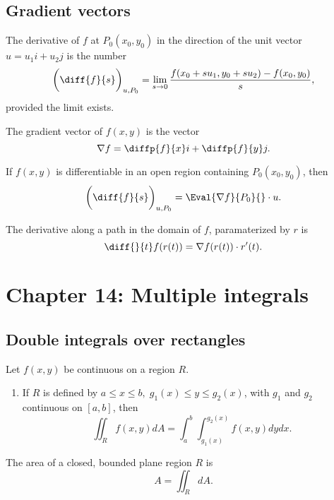 \documentclass{article}
\begin{document}
\subsection{Gradient vectors}
\begin{definition}
	The derivative of \(f\) at \(P_0(x_0,y_0)\) in the direction of the unit vector \(u=u_1i+u_2j\) is the number
	\begin{equation*}
		\bigg(\diff{f}{s}\bigg)_{u,P_0}=\lim_{s\rightarrow 0}\frac{f(x_0+su_1,y_0+su_2)-f(x_0,y_0)}{s},
	\end{equation*}
	provided the limit exists.
\end{definition}
\begin{definition}
	The gradient vector of \(f(x,y)\) is the vector
	\begin{equation*}
		\nabla f=\diffp{f}{x}i+\diffp{f}{y}j.
	\end{equation*}
\end{definition}
\begin{theorem}
	If \(f(x,y)\) is differentiable in an open region containing \(P_0(x_0,y_0)\), then
	\begin{equation*}
		\bigg(\diff{f}{s}\bigg)_{u,P_0}=\Eval{\nabla f}{P_0}{}\cdot u.
	\end{equation*}
\end{theorem}
\begin{proposition}
	The derivative along a path in the domain of \(f\), paramaterized by \(r\) is
	\begin{equation*}
		\diff{}{t}f(r(t))=\nabla f(r(t))\cdot r'(t).
	\end{equation*}
\end{proposition}
\section{Chapter 14: Multiple integrals}
\subsection{Double integrals over rectangles}
\begin{theorem}
	Let \(f(x,y)\) be continuous on a region \(R\).
	\begin{enumerate}
		\item If \(R\) is defined by \(a\leq x\leq b,\;g_1(x)\leq y\leq g_2(x)\), with \(g_1\) and \(g_2\) continuous on \([a,b]\), then
			\begin{equation*}
				\iint_R f(x,y)dA=\int_a^b\int_{g_1(x)}^{g_2(x)}f(x,y)dydx.
			\end{equation*}
	\end{enumerate}
\end{theorem}
\begin{proposition}
	The area of a closed, bounded plane region \(R\) is
	\begin{equation*}
		A=\iint_R dA.
	\end{equation*}
\end{proposition}
\end{document}
